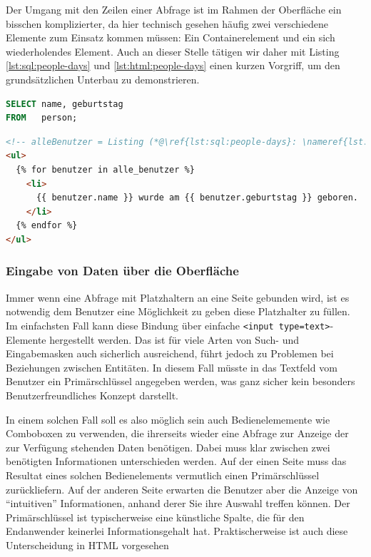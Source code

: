 Der Umgang mit den Zeilen einer Abfrage ist im Rahmen der Oberfläche ein bisschen komplizierter, da hier technisch gesehen häufig zwei verschiedene Elemente zum Einsatz kommen müssen: Ein Containerelement und ein sich wiederholendes Element. Auch an dieser Stelle tätigen wir daher mit Listing \ref{lst:sql:people-days} und \ref{lst:html:people-days} einen kurzen Vorgriff, um den grundsätzlichen Unterbau zu demonstrieren.

\begin{lstlisting}[language=SQL, caption=Abfrage mit beliebig vielen Ergebniszeilen,label=lst:sql:people-days]
SELECT name, geburtstag
FROM   person;
\end{lstlisting}

\begin{lstlisting}[language=HTML, caption=Containerelemente mit Kindern, label=lst:html:people-days]
<!-- alleBenutzer = Listing (*@\ref{lst:sql:people-days}: \nameref{lst:sql:people-days}@*) -->
<ul>
  {% for benutzer in alle_benutzer %}
    <li>
      {{ benutzer.name }} wurde am {{ benutzer.geburtstag }} geboren.
    </li>
  {% endfor %}
</ul>
\end{lstlisting}

\subsubsection{Eingabe von Daten über die Oberfläche}
\label{sec:design-ui-bind-input}

Immer wenn eine Abfrage mit Platzhaltern an eine Seite gebunden wird, ist es notwendig dem Benutzer eine Möglichkeit zu geben diese Platzhalter zu füllen. Im einfachsten Fall kann diese Bindung über einfache \texttt{<input type=text>}-Elemente hergestellt werden. Das ist für viele Arten von Such- und Eingabemasken auch sicherlich ausreichend, führt jedoch zu Problemen bei Beziehungen zwischen Entitäten. In diesem Fall müsste in das Textfeld vom Benutzer ein Primärschlüssel angegeben werden, was ganz sicher kein besonders Benutzerfreundliches Konzept darstellt.

In einem solchen Fall soll es also möglich sein auch Bedienelememente wie Comboboxen zu verwenden, die ihrerseits wieder eine Abfrage zur Anzeige der zur Verfügung stehenden Daten benötigen. Dabei muss klar zwischen zwei benötigten Informationen unterschieden werden. Auf der einen Seite muss das Resultat eines solchen Bedienelements vermutlich einen Primärschlüssel zurückliefern. Auf der anderen Seite erwarten die Benutzer aber die Anzeige von ``intuitiven'' Informationen, anhand derer Sie ihre Auswahl treffen können. Der Primärschlüssel ist typischerweise eine künstliche Spalte, die für den Endanwender keinerlei Informationsgehalt hat. Praktischerweise ist auch diese Unterscheidung in HTML vorgesehen

